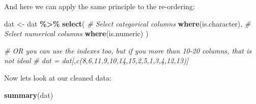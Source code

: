 \documentclass[
]{book}
\newenvironment{Shaded}{\begin{snugshade}}{\end{snugshade}}
\newcommand{\CommentTok}[1]{\textcolor[rgb]{0.56,0.35,0.01}{\textit{#1}}}
\newcommand{\FunctionTok}[1]{\textcolor[rgb]{0.13,0.29,0.53}{\textbf{#1}}}
\newcommand{\NormalTok}[1]{#1}
\newcommand{\OtherTok}[1]{\textcolor[rgb]{0.56,0.35,0.01}{#1}}
\newcommand{\SpecialCharTok}[1]{\textcolor[rgb]{0.81,0.36,0.00}{\textbf{#1}}}
\begin{document}
And here we can apply the same principle to the re-ordering:

\begin{Shaded}
\begin{Highlighting}[]
\NormalTok{dat }\OtherTok{\textless{}{-}}\NormalTok{ dat }\SpecialCharTok{\%\textgreater{}\%}
  \FunctionTok{select}\NormalTok{(}
    \CommentTok{\# Select categorical columns}
    \FunctionTok{where}\NormalTok{(is.character), }
    \CommentTok{\# Select numerical columns}
    \FunctionTok{where}\NormalTok{(is.numeric)}
\NormalTok{  )}

\CommentTok{\# OR you can use the indexes too, but if you more than 10{-}20 columns, that is not ideal}
\CommentTok{\# dat = dat[,c(8,6,11,9,10,14,15,2,5,1,3,4,12,13)]}
\end{Highlighting}
\end{Shaded}

Now lets look at our cleaned data:

\begin{Shaded}
\begin{Highlighting}[]
\FunctionTok{summary}\NormalTok{(dat)}
\end{Highlighting}
\end{Shaded}
\end{document}
